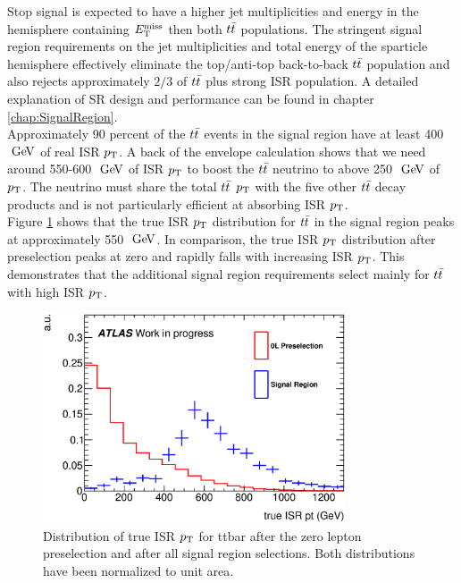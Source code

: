 \indent Stop signal is expected to have a higher jet multiplicities and energy in the hemisphere containing $E_{\mathrm{T}}^{\mathrm{miss}}$ then both $t\bar{t}$ populations.  The stringent signal region requirements on the jet multiplicities and total energy of the sparticle hemisphere effectively eliminate the top/anti-top back-to-back $t\bar{t}$ population and also rejects approximately $2/3$ of $t\bar{t}$ plus strong ISR population.  A detailed explanation of SR design and performance can be found in chapter \ref{chap:SignalRegion}. \\

\indent Approximately 90 percent of the $t\bar{t}$ events in the signal region have at least 400 $\gev$ of real ISR $\pt$.  A back of the envelope calculation shows that we need around 550-600 $\gev$ of ISR $\pt$ to boost the $t\bar{t}$ neutrino to above 250 $\gev$ of $\pt$.  The neutrino must share the total $t\bar{t}$ $\pt$ with the five other $t\bar{t}$ decay products and is not particularly efficient at absorbing ISR $\pt$.  \\

\indent Figure \ref{fig:ttbar:SR:trueISRpt_presel_SRC1} shows that the true ISR $\pt$ distribution for $t\bar{t}$ in the signal region peaks at approximately 550 $\gev$.  In comparison, the true ISR $\pt$ distribution after preselection peaks at zero and rapidly falls with increasing ISR $\pt$.  This demonstrates that the additional signal region requirements select mainly for $t\bar{t}$ with high ISR $\pt$.  \\

\begin{figure}[h!]
  \centering
	\includegraphics[width=0.80\textwidth]{./figures/strategy/Compare0L_truth.eps}
\caption[Distribution of true ISR $\pt$ for ttbar after the zero lepton preselection and after all signal region selections]{Distribution of true ISR $\pt$ for ttbar after the zero lepton preselection and after all signal region selections.  Both distributions have been normalized to unit area.}
\label{fig:ttbar:SR:trueISRpt_presel_SRC1}
\end{figure}

